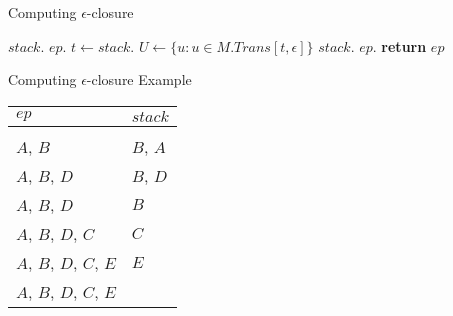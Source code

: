 \documentclass{beamer}
\begin{document}
\begin{frame}{Computing $\epsilon$-closure}
\footnotesize
\begin{algorithmic}[0]
  \State $stack$.
  \State $ep$.
    \State $t \gets stack$.
    \State $U \gets \{u : u \in M.Trans[t, \epsilon]\}$
        \State $stack$.
        \State $ep$.
      \EndIf
    \EndFor
  \EndWhile
  \State \textbf{return} $ep$
\EndProcedure

\end{algorithmic}

\end{frame}

\begin{frame}{Computing $\epsilon$-closure}
{Example}
\begin{center}

\vspace{1cm}

\begin{scriptsize}
\begin{tabular}{| l | l |}
\hline
\cellcolor{Gray!20}\color{Red}$ep$ & \cellcolor{Gray!20}\color{Red}$stack$ \\
\hline
& \\
\hline
\pause
$A$, $B$                & $B$, $A$  \\
\hline
\pause
$A$, $B$, $D$           & $B$, $D$ \\
\hline
\pause
$A$, $B$, $D$           & $B$ \\
\hline
\pause
$A$, $B$, $D$, $C$      & $C$ \\
\hline
\pause
$A$, $B$, $D$, $C$, $E$ & $E$ \\
\hline
\pause
$A$, $B$, $D$, $C$, $E$ &  \\
\hline

\end{tabular}
\end{scriptsize}
\end{center}
\end{frame}
\end{document}

